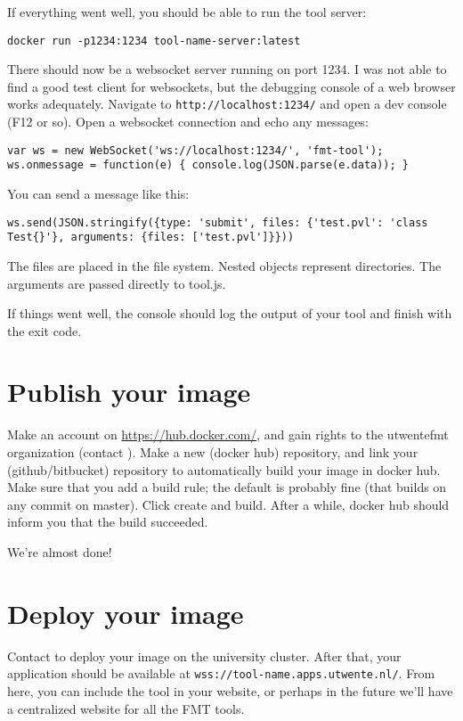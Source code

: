 \documentclass{article}
\begin{document}
If everything went well, you should be able to run the tool server:

\begin{lstlisting}
docker run -p1234:1234 tool-name-server:latest
\end{lstlisting}

There should now be a websocket server running on port 1234. I was not able to find a good test client for websockets, but the debugging console of a web browser works adequately. Navigate to \texttt{http://localhost:1234/} and open a dev console (F12 or so). Open a websocket connection and echo any messages:

\begin{lstlisting}
var ws = new WebSocket('ws://localhost:1234/', 'fmt-tool'); ws.onmessage = function(e) { console.log(JSON.parse(e.data)); }
\end{lstlisting}

You can send a message like this:

\begin{lstlisting}
ws.send(JSON.stringify({type: 'submit', files: {'test.pvl': 'class Test{}'}, arguments: {files: ['test.pvl']}}))
\end{lstlisting}

The files are placed in the file system. Nested objects represent directories. The arguments are passed directly to tool.js.

If things went well, the console should log the output of your tool and finish with the exit code.

\section{Publish your image}
Make an account on \url{https://hub.docker.com/}, and gain rights to the utwentefmt organization (contact \dockerHubAdmin). Make a new (docker hub) repository, and link your (github/bitbucket) repository to automatically build your image in docker hub. Make sure that you add a build rule; the default is probably fine (that builds on any commit on master). Click create and build. After a while, docker hub should inform you that the build succeeded.

We're almost done!

\section{Deploy your image}
Contact \utrancherAdmin to deploy your image on the university cluster. After that, your application should be available at \texttt{wss://tool-name.apps.utwente.nl/}. From here, you can include the tool in your website, or perhaps in the future we'll have a centralized website for all the FMT tools.
\end{document}
